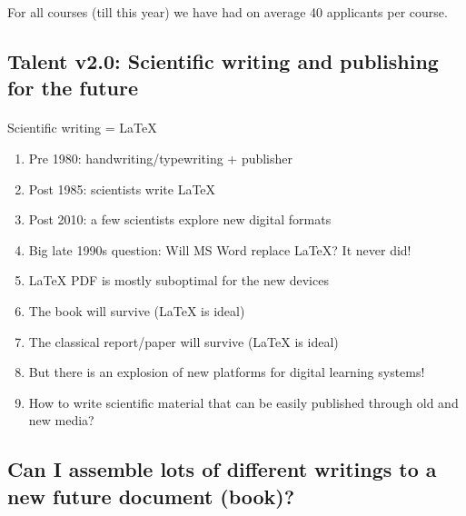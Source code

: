 \documentclass[%
twoside,                 %
final,                   %
10pt]{article}
\begin{document}
\noindent
For all courses (till this year) we have had on average 40 applicants per course.




\subsection*{Talent v2.0: Scientific writing and publishing for the future}

\paragraph{}
Scientific writing = {\LaTeX}

\begin{enumerate}
\item Pre 1980: handwriting/typewriting + publisher

\item Post 1985: scientists write {\LaTeX}

\item Post 2010: a few scientists explore new digital formats

\item Big late 1990s question: Will MS Word replace {\LaTeX}? It never did!

\item {\LaTeX} PDF is mostly suboptimal for the new devices

\item The book will survive ({\LaTeX} is ideal)

\item The classical report/paper will survive ({\LaTeX} is ideal)

\item But there is an explosion of new platforms for digital learning systems!

\item How to write scientific material that can be easily published through old and new media?
\end{enumerate}

\noindent




\subsection*{Can I assemble lots of different writings to a new future document (book)?}
\end{document}
